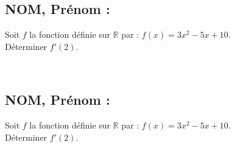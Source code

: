 \documentclass[a4paper,11pt,exos]{nsi} %
\begin{document}
\subsection*{NOM, Prénom : \dotfill} 


\maketitle




\begin{exercice}
    Soit $f$ la fonction définie sur $\mathbb{R}$ par : $f(x)= 3x^2-5x+10$.\\
        Déterminer $f'(2)$.
\end{exercice}
\\

\vspace{1cm}

\subsection*{NOM, Prénom : \dotfill} 


\maketitle




\begin{exercice}
    Soit $f$ la fonction définie sur $\mathbb{R}$ par : $f(x)= 3x^2-5x+10$.\\
        Déterminer $f'(2)$.
\end{exercice}
\end{document}
